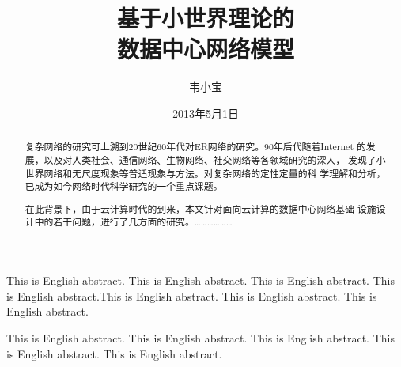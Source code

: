 \documentclass[oneside, phd]{njuthesis}
\title{基于小世界理论的\\ 数据中心网络模型}
\author{韦小宝}
\institute{南京大学}
\date{2013年5月1日}
\begin{document}
\maketitle

\makeenglishtitle

\frontmatter

\begin{abstract}

复杂网络的研究可上溯到20世纪60年代对ER网络的研究。90年后代随着Internet
的发展，以及对人类社会、通信网络、生物网络、社交网络等各领域研究的深入，
发现了小世界网络和无尺度现象等普适现象与方法。对复杂网络的定性定量的科
学理解和分析，已成为如今网络时代科学研究的一个重点课题。

在此背景下，由于云计算时代的到来，本文针对面向云计算的数据中心网络基础
设施设计中的若干问题，进行了几方面的研究。………………

\end{abstract}

\begin{englishabstract}

This is English abstract. This is English abstract. This is English
abstract. This is English abstract.This is English abstract. This is English
abstract. This is English abstract.

This is English abstract. This is English abstract. This is English
abstract. This is English abstract. This is English abstract.

\end{englishabstract}

\tableofcontents

\listoftables
\listoffigures

\mainmatter
\end{document}
